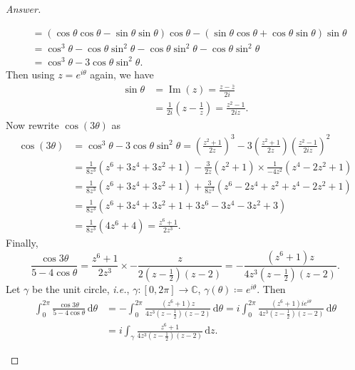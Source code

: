 \documentclass[12pt]{article}
\newcommand{\cx}{\mathbb{C}}
\newcommand{\ita}[1]{\textit{#1}}
\newcommand\paren[1]{\left( #1 \right)}
\theoremstyle{definition}
\DeclareMathOperator\im{Im}
\begin{document}
\begin{proof}[Answer]
\begin{enumerate}[(i)]
\begin{align*}
            & = \paren{ \cos \theta \cos \theta - \sin \theta \sin \theta } \cos \theta - \paren{ \sin \theta \cos \theta + \cos \theta \sin \theta } \sin \theta \\
            & = \cos^3 \theta - \cos \theta \sin^2 \theta - \cos \theta \sin^2 \theta - \cos \theta \sin^2 \theta \\
            & = \cos^3 \theta - 3 \cos \theta \sin^2 \theta.
        \end{align*}
        Then using $z = e^{i \theta}$ again, we have
        \begin{align*}
            \sin \theta & = \im(z) = \frac{z - \overline{z}}{2i} \\
            & = \frac{1}{2i} \paren{ z - \frac{1}{z} } = \frac{z^2 - 1}{2iz}.
        \end{align*}
        Now rewrite $\cos(3\theta)$ as 
        \begin{align*}
            \cos(3\theta) & = \cos^3 \theta - 3 \cos \theta \sin^2 \theta = \paren{ \frac{z^2 + 1}{2z} }^3 - 3 \paren{ \frac{z^2 + 1}{2z} } \paren{ \frac{z^2 - 1}{2iz} }^2 \\
            & = \frac{1}{8z^3} \paren{ z^6 + 3z^4 + 3z^2 + 1 } - \frac{3}{2z}(z^2 + 1) \times \frac{1}{-4z^2} \paren{ z^4 - 2z^2 + 1 } \\
            & = \frac{1}{8z^3} \paren{ z^6 + 3z^4 + 3z^2 + 1 } + \frac{3}{8z^3} \paren{ z^6 - 2z^4 + z^2 + z^4 - 2z^2 + 1 } \\
            & = \frac{1}{8z^3} \paren{ z^6 + 3z^4 + 3z^2 + 1 + 3z^6 -3z^4 - 3z^2 + 3 } \\
            & = \frac{1}{8z^3} \paren{ 4z^6 + 4 } = \frac{z^6 + 1}{2z^3}.
        \end{align*}
        Finally,
        \[
            \frac{\cos 3 \theta}{5 - 4\cos \theta} = \frac{z^6 + 1}{2z^3} \times -\frac{z}{2\paren{ z - \frac{1}{2} }(z-2)} = -\frac{ \paren{ z^6 + 1 } z }{ 4 z^3 \paren{ z - \frac{1}{2} }(z-2) }.
        \]
        Let $\gamma$ be the unit circle, \ita{i.e.}, $\gamma : [0,2\pi] \to \cx$, $\gamma(\theta) \coloneqq e^{i \theta}$. Then 
        \begin{align*}
            \int_0^{2\pi} \frac{\cos 3 \theta}{5 - 4\cos \theta} \, \mathrm{d} \theta & = -\int_0^{2\pi} \frac{ \paren{ z^6 + 1 } z }{ 4 z^3 \paren{ z - \frac{1}{2} }(z-2) } \, \mathrm{d} \theta = i \int_0^{2\pi} \frac{ \paren{ z^6 + 1 } i e^{i \theta} }{ 4 z^3 \paren{ z - \frac{1}{2} }(z-2) } \, \mathrm{d} \theta \\
            & = i \int_{\gamma} \frac{ z^6 + 1 }{ 4 z^3 \paren{ z - \frac{1}{2} }(z-2) } \, \mathrm{d}z.

\end{align*}
\end{enumerate}
\end{proof}
\end{document}
